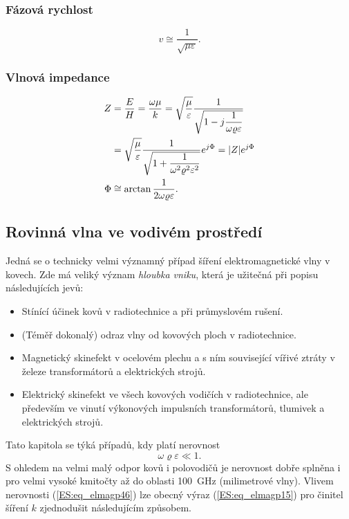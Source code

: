     \subsubsection{Fázová rychlost}
    \begin{equation}\label{ES:eq_elmagp45}
      v \cong \frac{1}{\sqrt{\mu\varepsilon}}.
    \end{equation}
    
    \subsubsection{Vlnová impedance}
    \begin{subequations}
      \begin{align}
           Z &= \frac{E}{H} = \frac{\omega\mu}{k} 
              = \sqrt{\frac{\mu}{\varepsilon}}                             
                     \frac{1}{\sqrt{1 - j\dfrac{1}{\omega\varrho\varepsilon}}}    \nonumber \\
             &= \sqrt{\frac{\mu}{\varepsilon}}           
                     \frac{1}{\sqrt{1 + 
                        \dfrac{1}{\omega^2\varrho^2\varepsilon^2}}}e^{j\Phi} 
              = \lvert Z\rvert e^{j\Phi}                                   \label{ES:eq_elmagp46a}  \\
        \Phi &\cong \arctan\frac{1}{2\omega\varrho\varepsilon}.    \label{ES:eq_elmagp46b}
    \end{align}
    \end{subequations}

    \subsection{Rovinná vlna ve vodivém prostředí}
      Jedná se o technicky velmi významný případ šíření elektromagnetické vlny v kovech. Zde má 
      veliký význam \emph{hloubka vniku}, která je užitečná při popisu následujících jevů:
      \begin{itemize}\addtolength{\itemsep}{-0.5\baselineskip}
        \item Stínící účinek kovů v radiotechnice a při průmyslovém rušení.
        \item (Téměř dokonalý) odraz vlny od kovových ploch v radiotechnice.
        \item Magnetický skinefekt v ocelovém plechu a s ním související vířivé ztráty v železe 
              transformátorů a elektrických strojů.
        \item Elektrický skinefekt ve všech kovových vodičích v radiotechnice, ale především ve 
              vinutí výkonových impulsních transformátorů, tlumivek a elektrických strojů.
     \end{itemize}
     Tato kapitola se týká případů, kdy platí nerovnost
     \begin{equation}\label{ES:eq_elmagp46}
       \omega\varrho\varepsilon \ll 1.
     \end{equation}
     S ohledem na velmi malý odpor kovů i polovodičů je nerovnost dobře splněna i pro velmi 
     vysoké kmitočty až do oblasti \SI{100}{\GHz} (milimetrové vlny). Vlivem nerovnosti 
     (\ref{ES:eq_elmagp46}) lze obecný výraz (\ref{ES:eq_elmagp15}) pro činitel šíření \(k\) 
     zjednodušit následujícím způsobem.
     
